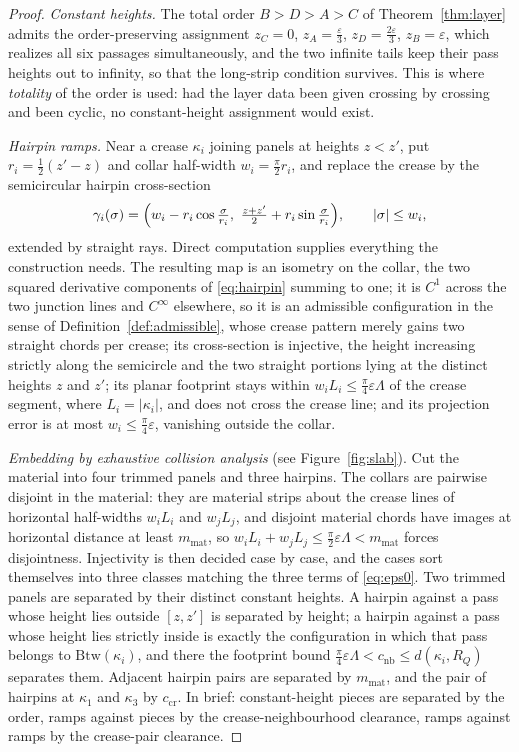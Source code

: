 \begin{proof}
\emph{Constant heights.} The total order $B>D>A>C$ of Theorem~\ref{thm:layer} admits the order-preserving assignment $z_C=0$, $z_A=\frac\varepsilon3$, $z_D=\frac{2\varepsilon}3$, $z_B=\varepsilon$, which realizes all six passages simultaneously, and the two infinite tails keep their pass heights out to infinity, so that the long-strip condition survives. This is where \emph{totality} of the order is used: had the layer data been given crossing by crossing and been cyclic, no constant-height assignment would exist.

\emph{Hairpin ramps.} Near a crease $\kappa_i$ joining panels at heights $z<z'$, put $r_i=\frac12(z'-z)$ and collar half-width $w_i=\frac\pi2r_i$, and replace the crease by the semicircular hairpin cross-section
\begin{equation}\label{eq:hairpin}
  \gamma_i(\sigma)=\Bigl(w_i-r_i\cos\tfrac\sigma{r_i},\ \tfrac{z+z'}2+r_i\sin\tfrac\sigma{r_i}\Bigr),\qquad\lvert\sigma\rvert\le w_i,
\end{equation}
extended by straight rays. Direct computation supplies everything the construction needs. The resulting map is an isometry on the collar, the two squared derivative components of \eqref{eq:hairpin} summing to one; it is $C^1$ across the two junction lines and $C^\infty$ elsewhere, so it is an admissible configuration in the sense of Definition~\ref{def:admissible}, whose crease pattern merely gains two straight chords per crease; its cross-section is injective, the height increasing strictly along the semicircle and the two straight portions lying at the distinct heights $z$ and $z'$; its planar footprint stays within $w_iL_i\le\frac\pi4\varepsilon\Lambda$ of the crease segment, where $L_i=\lvert\kappa_i\rvert$, and does not cross the crease line; and its projection error is at most $w_i\le\frac\pi4\varepsilon$, vanishing outside the collar.

\emph{Embedding by exhaustive collision analysis} (see Figure~\ref{fig:slab}). Cut the material into four trimmed panels and three hairpins. The collars are pairwise disjoint in the material: they are material strips about the crease lines of horizontal half-widths $w_iL_i$ and $w_jL_j$, and disjoint material chords have images at horizontal distance at least $m_{\mathrm{mat}}$, so $w_iL_i+w_jL_j\le\frac\pi2\varepsilon\Lambda<m_{\mathrm{mat}}$ forces disjointness. Injectivity is then decided case by case, and the cases sort themselves into three classes matching the three terms of \eqref{eq:eps0}. Two trimmed panels are separated by their distinct constant heights. A hairpin against a pass whose height lies outside $[z,z']$ is separated by height; a hairpin against a pass whose height lies strictly inside is exactly the configuration in which that pass belongs to $\mathrm{Btw}(\kappa_i)$, and there the footprint bound $\frac\pi4\varepsilon\Lambda<c_{\mathrm{nb}}\le d(\kappa_i,R_Q)$ separates them. Adjacent hairpin pairs are separated by $m_{\mathrm{mat}}$, and the pair of hairpins at $\kappa_1$ and $\kappa_3$ by $c_{\mathrm{cr}}$. In brief: constant-height pieces are separated by the order, ramps against pieces by the crease-neighbourhood clearance, ramps against ramps by the crease-pair clearance.


\end{proof}
